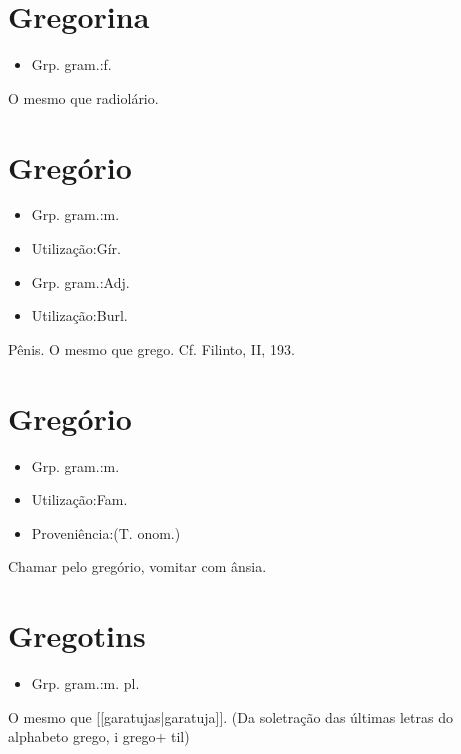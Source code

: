 \section{Gregorina}
\begin{itemize}
\item {Grp. gram.:f.}
\end{itemize}
O mesmo que \textunderscore radiolário\textunderscore .
\section{Gregório}
\begin{itemize}
\item {Grp. gram.:m.}
\end{itemize}
\begin{itemize}
\item {Utilização:Gír.}
\end{itemize}
\begin{itemize}
\item {Grp. gram.:Adj.}
\end{itemize}
\begin{itemize}
\item {Utilização:Burl.}
\end{itemize}
Pênis.
O mesmo que \textunderscore grego\textunderscore . Cf. Filinto, II, 193.
\section{Gregório}
\begin{itemize}
\item {Grp. gram.:m.}
\end{itemize}
\begin{itemize}
\item {Utilização:Fam.}
\end{itemize}
\begin{itemize}
\item {Proveniência:(T. onom.)}
\end{itemize}
\textunderscore Chamar pelo gregório\textunderscore , vomitar com ânsia.
\section{Gregotins}
\begin{itemize}
\item {Grp. gram.:m. pl.}
\end{itemize}
O mesmo que [[garatujas|garatuja]].
(Da soletração das últimas letras do alphabeto grego, \textunderscore i grego\textunderscore  + \textunderscore til\textunderscore )
